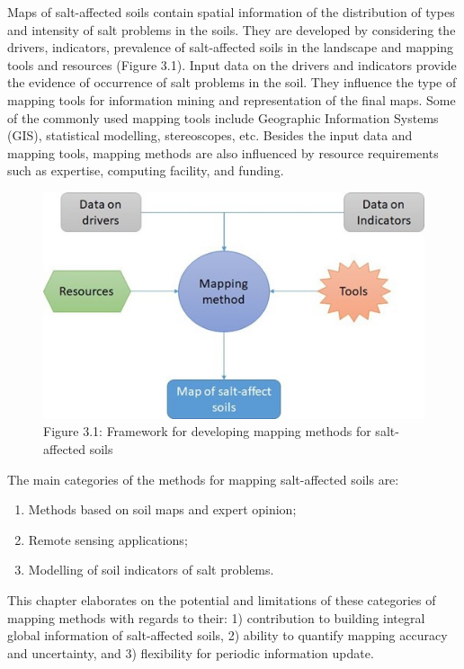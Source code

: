 \documentclass[
  10pt,
  b5paper,
]{book}
\providecommand{\tightlist}{%
  \setlength{\itemsep}{0pt}\setlength{\parskip}{0pt}}
\begin{document}
Maps of salt-affected soils contain spatial information of the distribution of types and intensity of salt problems in the soils. They are developed by considering the drivers, indicators, prevalence of salt-affected soils in the landscape and mapping tools and resources (Figure 3.1). Input data on the drivers and indicators provide the evidence of occurrence of salt problems in the soil. They influence the type of mapping tools for information mining and representation of the final maps. Some of the commonly used mapping tools include Geographic Information Systems (GIS), statistical modelling, stereoscopes, etc. Besides the input data and mapping tools, mapping methods are also influenced by resource requirements such as expertise, computing facility, and funding.

\begin{figure}
\centering
\includegraphics{figures/images/Figure3.1.jpg}
\caption{Figure 3.1: Framework for developing mapping methods for salt-affected soils}
\end{figure}

The main categories of the methods for mapping salt-affected soils are:

\begin{enumerate}
\def\labelenumi{\roman{enumi}.}
\tightlist
\item
  Methods based on soil maps and expert opinion;
\item
  Remote sensing applications;
\item
  Modelling of soil indicators of salt problems.
\end{enumerate}

This chapter elaborates on the potential and limitations of these categories of mapping methods with regards to their: 1) contribution to building integral global information of salt-affected soils, 2) ability to quantify mapping accuracy and uncertainty, and 3) flexibility for periodic information update.
\end{document}
